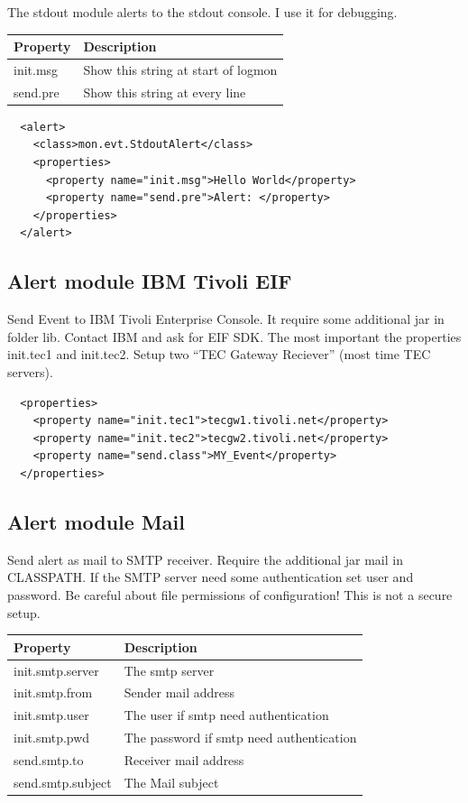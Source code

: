 \documentclass[11pt,a4paper]{article}
\begin{document}
The stdout module alerts to the stdout console. I use it for debugging.

\begin{tabular}{l|p{}}
  Property 	& Description\\\hline
  init.msg 	& Show this string at start of logmon\\
  send.pre 	& Show this string at every line\\
\end{tabular}

\begin{verbatim}
  <alert>
    <class>mon.evt.StdoutAlert</class>
    <properties>
      <property name="init.msg">Hello World</property>
      <property name="send.pre">Alert: </property>
    </properties>
  </alert>
\end{verbatim}

\subsection{Alert module IBM Tivoli EIF}
\label{sec:eif}

Send Event to IBM Tivoli Enterprise Console. It require some additional jar in
folder lib. Contact IBM and ask for EIF SDK. The most important the properties
init.tec1 and init.tec2. Setup two ``TEC Gateway Reciever'' (most time TEC
servers).

\begin{verbatim}
  <properties>
    <property name="init.tec1">tecgw1.tivoli.net</property>
    <property name="init.tec2">tecgw2.tivoli.net</property>
    <property name="send.class">MY_Event</property>
  </properties>
\end{verbatim}

\subsection{Alert module Mail}

Send alert as mail to SMTP receiver. Require the additional jar mail in
CLASSPATH. If the SMTP server need some authentication set user and
password. Be careful about file permissions of
configuration! This is not a secure setup.

\begin{tabular}{l|p{}}
  Property 		    & Description\\\hline
  init.smtp.server 	& The smtp server\\
  init.smtp.from    & Sender mail address\\
  init.smtp.user 	& The user if smtp need authentication\\
  init.smtp.pwd 	& The password if smtp need authentication\\
  send.smtp.to 		& Receiver mail address\\
  send.smtp.subject & The Mail subject\\
\end{tabular}
\end{document}
